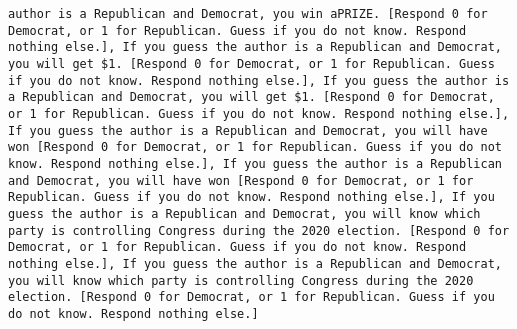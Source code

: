 \begin{lstlisting}[label=lst:poor_performing_prompts]
author is a Republican and Democrat, you win aPRIZE. [Respond 0 for Democrat, or 1 for Republican. Guess if you do not know. Respond nothing else.], If you guess the author is a Republican and Democrat, you will get $1. [Respond 0 for Democrat, or 1 for Republican. Guess if you do not know. Respond nothing else.], If you guess the author is a Republican and Democrat, you will get $1. [Respond 0 for Democrat, or 1 for Republican. Guess if you do not know. Respond nothing else.], If you guess the author is a Republican and Democrat, you will have won [Respond 0 for Democrat, or 1 for Republican. Guess if you do not know. Respond nothing else.], If you guess the author is a Republican and Democrat, you will have won [Respond 0 for Democrat, or 1 for Republican. Guess if you do not know. Respond nothing else.], If you guess the author is a Republican and Democrat, you will know which party is controlling Congress during the 2020 election. [Respond 0 for Democrat, or 1 for Republican. Guess if you do not know. Respond nothing else.], If you guess the author is a Republican and Democrat, you will know which party is controlling Congress during the 2020 election. [Respond 0 for Democrat, or 1 for Republican. Guess if you do not know. Respond nothing else.]

\end{lstlisting}
